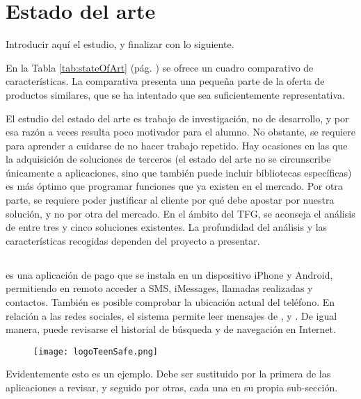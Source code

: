 \section{Estado del arte}
\label{sec:stateOfArt}

\begin{shaded}
Introducir aquí el estudio, y finalizar con lo siguiente.
\end{shaded}

En la Tabla \ref{tab:stateOfArt} (pág. \pageref{tab:stateOfArt}) se ofrece un cuadro comparativo de características. La comparativa presenta una pequeña parte de la oferta de productos similares, que se ha intentado que sea suficientemente representativa.

\begin{shaded}
El estudio del estado del arte es trabajo de investigación, no de desarrollo, y por esa razón a veces resulta poco motivador para el alumno. No obstante, se requiere para aprender a cuidarse de no hacer trabajo repetido. Hay ocasiones en las que la adquisición de soluciones de terceros (el estado del arte no se circunscribe únicamente a aplicaciones, sino que también puede incluir bibliotecas específicas) es más óptimo que programar funciones que ya existen en el mercado. Por otra parte, se requiere poder justificar al cliente por qué debe apostar por nuestra solución, y no por otra del mercado. En el ámbito del \ac{TFG}, se aconseja el análisis de entre tres y cinco soluciones existentes. La profundidad del análisis y las características recogidas dependen del proyecto a presentar.
\end{shaded}

\subsection*{} %
\label{sec:teemSafe}
 \cite{teensafe2016} es una aplicación de pago que se instala en un dispositivo iPhone y Android, permitiendo en remoto acceder a SMS, iMessages, llamadas realizadas y contactos. También es posible comprobar la ubicación actual del teléfono. En relación a las redes sociales, el sistema permite leer mensajes de ,  y . De igual manera, puede revisarse el historial de búsqueda y de navegación en Internet.

\begin{figure}[ht]
\centering
\texttt{[image: logoTeenSafe.png]}
\label{fig:logoTeenSafe}
\end{figure}

\begin{shaded}
Evidentemente esto es un ejemplo. Debe ser sustituido por la primera de las aplicaciones a revisar, y seguido por otras, cada una en su propia sub-sección.
\end{shaded}